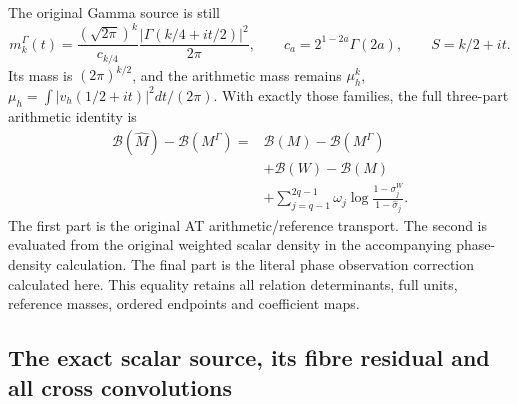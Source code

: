 The original Gamma source is still
\[
 m_k^\Gamma(t)=\frac{(\sqrt{2\pi})^k}{c_{k/4}}
                 \frac{|\Gamma(k/4+it/2)|^2}{2\pi},\qquad
 c_a=2^{1-2a}\Gamma(2a),\qquad S=k/2+it.
\tag{PGS.33}\label{GraphV2:eq:pgs-reference}
\]
Its mass is \((2\pi)^{k/2}\), and the arithmetic mass remains
\(\mu_h^k\), \(\mu_h=\int |v_h(1/2+it)|^2dt/(2\pi)\).
With exactly those families, the full three-part arithmetic identity is
\[
\begin{aligned}
 \mathcal B(\widehat M)-\mathcal B(M^\Gamma)
  ={}&\mathcal B(M)-\mathcal B(M^\Gamma)\\
    &+\mathcal B(W)-\mathcal B(M)\\
    &+\sum_{j=q-1}^{2q-1}\omega_j
             \log\frac{1-\sigma_j^W}{1-\widehat\sigma_j}.
\end{aligned}
\tag{PGS.34}\label{GraphV2:eq:pgs-three-part}
\]
The first part is the original AT arithmetic/reference transport.
The second is evaluated from the original weighted scalar density in
the accompanying phase-density calculation. The final part is the
literal phase observation correction calculated here. This equality
retains all relation determinants, full units, reference masses,
ordered endpoints and coefficient maps.

\subsection{The exact scalar source, its fibre residual and all cross convolutions}

